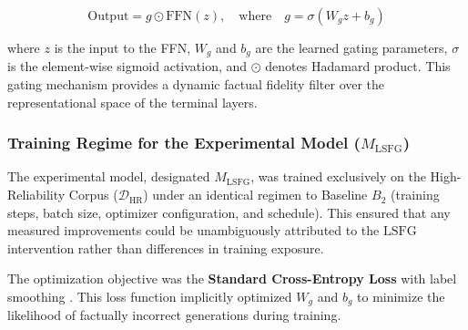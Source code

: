 \[
\text{Output} = g \odot \text{FFN}(z), \quad \text{where} \quad g = \sigma(W_g z + b_g)
\]

\noindent
where $z$ is the input to the FFN, $W_g$ and $b_g$ are the learned gating parameters, $\sigma$ is the element-wise sigmoid activation, and $\odot$ denotes Hadamard product. This gating mechanism provides a dynamic factual fidelity filter over the representational space of the terminal layers.

\subsubsection{Training Regime for the Experimental Model ($M_{\text{LSFG}}$)}
\label{sec:experimental_training}
The experimental model, designated $M_{\text{LSFG}}$, was trained exclusively on the High-Reliability Corpus ($\mathcal{D}_{\text{HR}}$) under an identical regimen to Baseline $B_2$ (training steps, batch size, optimizer configuration, and schedule). This ensured that any measured improvements could be unambiguously attributed to the $\text{LSFG}$ intervention rather than differences in training exposure.

The optimization objective was the \textbf{Standard Cross-Entropy Loss} with label smoothing \cite{vaswani2017attention}. This loss function implicitly optimized $W_g$ and $b_g$ to minimize the likelihood of factually incorrect generations during training.